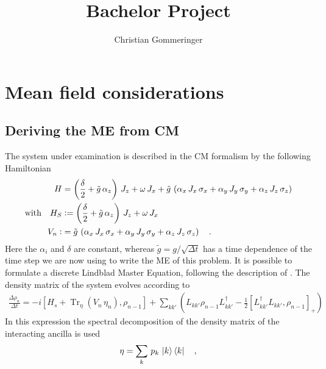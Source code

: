 \documentclass{article}
\title{Bachelor Project}
\author{Christian Gommeringer}
\begin{document}
\newcommand{\half}{\frac{1}{2}}
\newcommand{\Tr}{\operatorname{Tr}}
\newcommand{\Trs}[1]{\Tr_S\left\{#1\right\}}
\newcommand{\dt}{\frac{\text{d}}{\text{d}t}}
\newcommand{\tk}{\tilde{\kappa}}
\newcommand{\tw}{\tilde{\omega}}
\newcommand{\dkw}{\left(\frac{\text{d}}{\text{d}\tilde{y}}\,\frac{\Omega^2}{K}\right)}
\newcommand{\kw}{\frac{\Omega^2}{K}}
\newcommand{\ty}{\tilde{y}}
\maketitle
\section*{Mean field considerations}
\subsection*{Deriving the ME from CM}
The system under examination is described in the CM formalism by the following Hamiltonian
\begin{align}\label{eq:Ham}
    H&=\left(\frac{\delta}{2}+\tilde{g}\,\alpha_z\right)\,J_z+\omega\,J_x+\tilde{g}\,\left(\alpha_x\,J_x\,\sigma_x+\alpha_y\,J_y\,\sigma_y+\alpha_z\,J_z\,\sigma_z\right)\notag\\
    \text{with}\quad{H_S}&\vcentcolon=\left(\frac{\delta}{2}+\tilde{g}\,\alpha_z\right)\,J_z+\omega\,J_x\\
    V_n\vcentcolon&=\tilde{g}\,\left(\alpha_x\,J_x\,\sigma_x+\alpha_y\,J_y\,\sigma_y+\alpha_z\,J_z\,\sigma_z\right)\quad.\notag
\end{align}
Here the $\alpha_i$ and $\delta$ are constant, whereas $\tilde{g}=g/\sqrt{\Delta{t}}$ has a time dependence of the time step we are now using to write the ME of this problem.
It is possible to formulate a discrete Lindblad Master Equation, following the description of \cite{overview}. The density matrix of the system evolves according to
\begin{align}\label{eq:ME}
\frac{\Delta \rho_n}{\Delta t} = -i[H_s + \operatorname{Tr}_\eta(V_n\,\eta_n), \rho_{n-1}] + \sum_{kk'} \left( L_{kk'} \rho_{n-1} L_{kk'}^\dagger - \frac{1}{2} \left[L_{kk'}^\dagger L_{kk'}, \rho_{n-1} \right]_+\right)
\end{align}
In this expression the spectral decomposition of the density matrix of the interacting ancilla is used
\begin{equation*}
    \eta=\sum_k\,p_k\,\ket{k}\bra{k}\quad,
\end{equation*}
\end{document}
